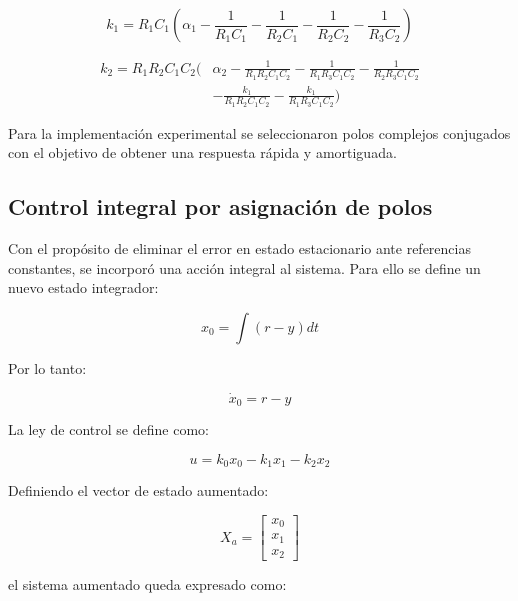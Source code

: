 \documentclass[12pt,letterpaper,twoside]{article}
\begin{document}
\begin{equation}
k_1 = R_1C_1
\left(
\alpha_1
-\frac{1}{R_1C_1}
-\frac{1}{R_2C_1}
-\frac{1}{R_2C_2}
-\frac{1}{R_3C_2}
\right)
\end{equation}

\begin{equation}
\begin{aligned}
k_2 = R_1R_2C_1C_2
\Bigg(
&\alpha_2
-\frac{1}{R_1R_2C_1C_2}
-\frac{1}{R_1R_3C_1C_2}
-\frac{1}{R_2R_3C_1C_2}\\
&-\frac{k_1}{R_1R_2C_1C_2}
-\frac{k_1}{R_1R_3C_1C_2}
\Bigg)
\end{aligned}
\end{equation}

Para la implementación experimental se seleccionaron polos complejos conjugados con el objetivo de obtener una respuesta rápida y amortiguada.

\subsection{Control integral por asignación de polos}
\label{sec:IntAdP}

Con el propósito de eliminar el error en estado estacionario ante referencias constantes, se incorporó una acción integral al sistema. Para ello se define un nuevo estado integrador:

\begin{equation}
x_0 = \int (r-y)dt
\end{equation}

Por lo tanto:

\begin{equation}
\dot{x}_0 = r-y
\end{equation}

La ley de control se define como:

\begin{equation}
u = k_0x_0-k_1x_1-k_2x_2
\end{equation}

Definiendo el vector de estado aumentado:

\begin{equation}
X_a =
\begin{bmatrix}
x_0 \\
x_1 \\
x_2
\end{bmatrix}
\end{equation}

el sistema aumentado queda expresado como:
\end{document}
